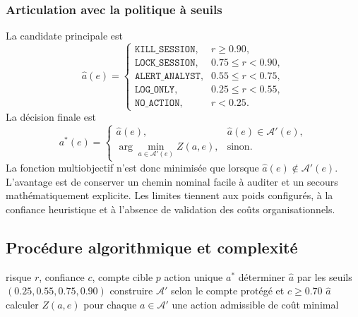 \documentclass[11pt,a4paper,oneside]{report}
\theoremstyle{definition}
\theoremstyle{plain}
\begin{document}
\subsubsection*{Articulation avec la politique à seuils}

La candidate principale est
\begin{equation}
\hat a(e)=
\begin{cases}
\texttt{KILL\_SESSION},&r\geq0.90,\\
\texttt{LOCK\_SESSION},&0.75\leq r<0.90,\\
\texttt{ALERT\_ANALYST},&0.55\leq r<0.75,\\
\texttt{LOG\_ONLY},&0.25\leq r<0.55,\\
\texttt{NO\_ACTION},&r<0.25.
\end{cases}
\label{eq:ai-ro-response-thresholds}
\end{equation}
La décision finale est
\begin{equation}
a^*(e)=
\begin{cases}
\hat a(e),&\hat a(e)\in\mathcal{A}'(e),\\
\displaystyle\arg\min_{a\in\mathcal{A}'(e)}Z(a,e),&\text{sinon}.
\end{cases}
\label{eq:ai-ro-response-decision}
\end{equation}
La fonction multiobjectif n'est donc minimisée que lorsque
$\hat a(e)\notin\mathcal{A}'(e)$. L'avantage est de conserver un chemin nominal
facile à auditer et un secours mathématiquement explicite. Les limites tiennent
aux poids configurés, à la confiance heuristique et à l'absence de validation
des coûts organisationnels.

\subsection*{Procédure algorithmique et complexité}

\begin{algorithm}[H]
\caption{Sélection d'une réponse admissible}
\label{alg:ai-ro-response}
\begin{algorithmic}[1]
\Require risque $r$, confiance $c$, compte cible $p$
\Ensure action unique $a^*$
\State déterminer $\hat a$ par les seuils $(0.25,0.55,0.75,0.90)$
\State construire $\mathcal{A}'$ selon le compte protégé et $c\geq0.70$
  \State \Return $\hat a$
\Else
  \State calculer $Z(a,e)$ pour chaque $a\in\mathcal{A}'$
  \State \Return une action admissible de coût minimal
\EndIf
\end{algorithmic}
\end{algorithm}
\end{document}
